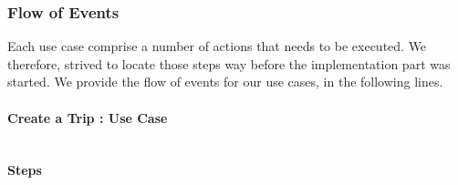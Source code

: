 \subsubsection{Flow of Events}

Each use case comprise a number of actions that needs to be executed. We therefore, strived to locate those steps way before the implementation part was started. We provide the flow of events for our use cases, in the following lines.

\paragraph{Create a Trip : Use Case}
\mbox{}\\
\newline
\textcolor[rgb]{0.00,0.00,1.00}{\textbf{Steps}}

